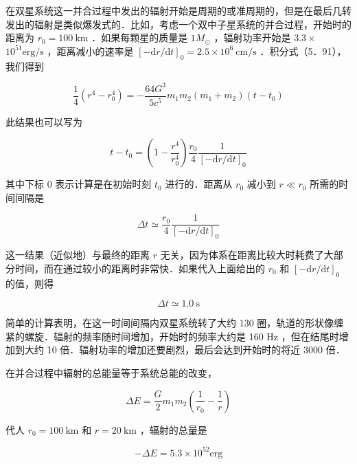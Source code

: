 在双星系统这一并合过程中发出的辐射开始是周期的或准周期的，但是在最后几转发出的辐射是类似爆发式的．比如，考虑一个双中子星系统的并合过程，开始时的距离为 $r_{0}=100 \mathrm{~km}$ ．如果每颗星的质量是 $1 M_{\odot}$ ，辐射功率开始是 $3.3 \times$ $10^{51} \mathrm{erg} / \mathrm{s}$ ，距离减小的速率是 $[-\mathrm{d} r / \mathrm{d} t]_{0}=2.5 \times 10^{6} \mathrm{~cm} / \mathrm{s}$ ．积分式（5．91），我们得到


\begin{equation*}
	\frac{1}{4}\left(r^{4}-r_{0}^{4}\right)=-\frac{64 G^{3}}{5 c^{5}} m_{1} m_{2}\left(m_{1}+m_{2}\right)\left(t-t_{0}\right) \tag{5.94}
\end{equation*}


此结果也可以写为


\begin{equation*}
	t-t_{0}=\left(1-\frac{r^{4}}{r_{0}^{4}}\right) \frac{r_{0}}{4} \frac{1}{[-\mathrm{d} r / \mathrm{d} t]_{0}} \tag{5.95}
\end{equation*}


其中下标 0 表示计算是在初始时刻 $t_{0}$ 进行的．距离从 $r_{0}$ 减小到 $r \ll r_{0}$ 所需的时间间隔是


\begin{equation*}
	\Delta t \simeq \frac{r_{0}}{4} \frac{1}{[-\mathrm{d} r / \mathrm{d} t]_{0}} \tag{5.96}
\end{equation*}


这一结果（近似地）与最终的距离 $r$ 无关，因为体系在距离比较大时耗费了大部分时间，而在通过较小的距离时非常快．如果代入上面给出的 $r_{0}$ 和 $[-\mathrm{d} r / \mathrm{d} t]_{0}$ 的值，则得


\begin{equation*}
	\Delta t \simeq 1.0 \mathrm{~s} \tag{5.97}
\end{equation*}


简单的计算表明，在这一时间间隔内双星系统转了大约 130 圈，轨道的形状像缠紧的螺旋．辐射的频率随时间增加，开始时的频率大约是 160 Hz ，但在结尾时增加到大约 10 倍．辐射功率的增加还要剧烈，最后会达到开始时的将近 3000 倍．

在并合过程中辐射的总能量等于系统总能的改变，


\begin{equation*}
	\Delta E=\frac{G}{2} m_{1} m_{2}\left(\frac{1}{r_{0}}-\frac{1}{r}\right) \tag{5.98}
\end{equation*}


代人 $r_{0}=100 \mathrm{~km}$ 和 $r=20 \mathrm{~km}$ ，辐射的总量是


\begin{equation*}
	-\Delta E=5.3 \times 10^{52} \mathrm{erg} \tag{5.99}
\end{equation*}


